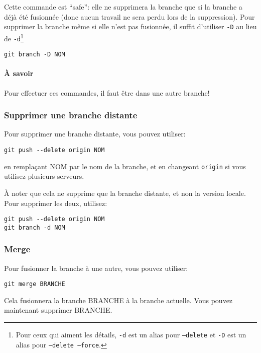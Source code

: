 \documentclass[10pt,a4paper]{article}
\begin{document}
Cette commande est ``safe'': elle ne supprimera la branche que si la branche a déjà été fusionnée (donc aucun travail ne sera perdu lors de la suppression). Pour supprimer la branche même si elle n'est pas fusionnée, il suffit d'utiliser {\tt -D} au lieu de {\tt -d}\footnote{Pour ceux qui aiment les détails, {\tt -d} est un alias pour \texttt{--delete} et {\tt -D} est un alias pour \texttt{--delete --force}.}

\begin{verbatim}
git branch -D NOM
\end{verbatim}

\paragraph{À savoir} Pour effectuer ces commandes, il faut être dans une autre branche!

\subsubsection{Supprimer une branche distante}

Pour supprimer une branche distante, vous pouvez utiliser:

\begin{verbatim}
git push --delete origin NOM
\end{verbatim}

en remplaçant NOM par le nom de la branche, et en changeant {\tt origin} si vous utilisez plusieurs serveurs.

À noter que cela ne supprime que la branche distante, et non la version locale. Pour supprimer les deux, utilisez:

\begin{verbatim}
git push --delete origin NOM
git branch -d NOM
\end{verbatim}

\subsubsection{Merge}

Pour fusionner la branche à une autre, vous pouvez utiliser:

\begin{verbatim}
git merge BRANCHE
\end{verbatim}

Cela fusionnera la branche BRANCHE à la branche actuelle. Vous pouvez maintenant supprimer BRANCHE.
\end{document}
